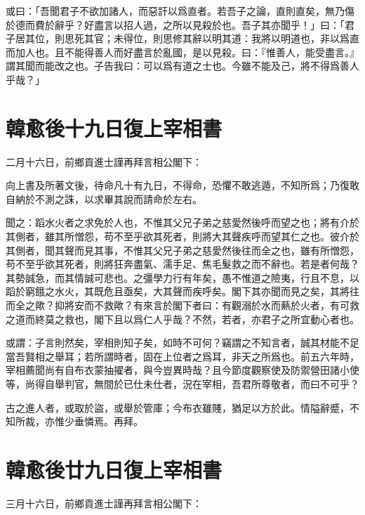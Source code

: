或曰：「吾聞君子不欲加諸人，而惡訐以爲直者。若吾子之論，直則直矣，無乃傷於德而費於辭乎？好盡言以招人過，之所以見殺於也。吾子其亦聞乎！」曰：「君子居其位，則思死其官；未得位，則思修其辭以明其道：我將以明道也，非以爲直而加人也。且不能得善人而好盡言於亂國，是以見殺。曰：『惟善人，能受盡言。』謂其聞而能改之也。子告我曰：可以爲有道之士也。今雖不能及己，將不得爲善人乎哉？」

\section[後十九日復上宰相書\quad{\small 韓愈}]{{\normalsize 韓愈}\quad 後十九日復上宰相書}
{\parindent=0pt 二月十六日，前鄉貢進士謹再拜言相公閣下：}

向上書及所著文後，待命凡十有九日，不得命，恐懼不敢逃遁，不知所爲；乃復敢自納於不測之誅，以求畢其說而請命於左右。

聞之：蹈水火者之求免於人也，不惟其父兄子弟之慈愛然後呼而望之也；將有介於其側者，雖其所憎怨，苟不至乎欲其死者，則將大其聲疾呼而望其仁之也。彼介於其側者，聞其聲而見其事，不惟其父兄子弟之慈愛然後往而全之也，雖有所憎怨，苟不至乎欲其死者，則將狂奔盡氣、濡手足、焦毛髮救之而不辭也。若是者何哉？其勢誠急，而其情誠可悲也。之彊學力行有年矣，愚不惟道之險夷，行且不息，以蹈於窮餓之水火，其既危且亟矣，大其聲而疾呼矣。閣下其亦聞而見之矣，其將往而全之歟？抑將安而不救歟？有來言於閣下者曰：有觀溺於水而爇於火者，有可救之道而終莫之救也，閣下且以爲仁人乎哉？不然，若者，亦君子之所宜動心者也。

或謂：子言則然矣，宰相則知子矣，如時不可何？竊謂之不知言者，誠其材能不足當吾賢相之舉耳；若所謂時者，固在上位者之爲耳，非天之所爲也。前五六年時，宰相薦聞尚有自布衣蒙抽擢者，與今豈異時哉？且今節度觀察使及防禦營田諸小使等，尚得自舉判官，無間於已仕未仕者，況在宰相，吾君所尊敬者，而曰不可乎？

古之進人者，或取於盜，或舉於管庫；今布衣雖賤，猶足以方於此。情隘辭蹙，不知所裁，亦惟少垂憐焉。再拜。

\section[後廿九日復上宰相書\quad{\small 韓愈}]{{\normalsize 韓愈}\quad 後廿九日復上宰相書}
{\parindent=0pt 三月十六日，前鄉貢進士謹再拜言相公閣下：}

